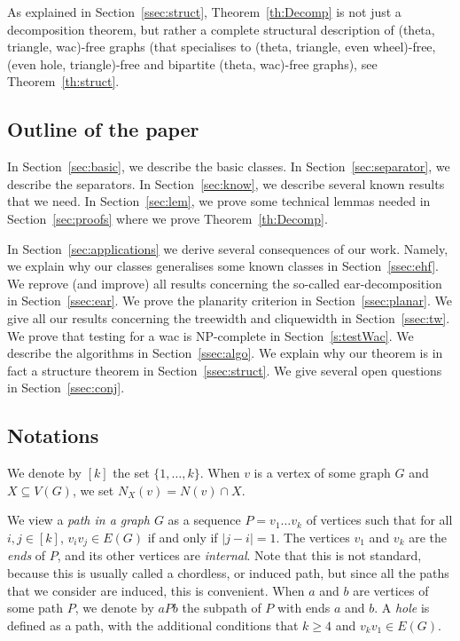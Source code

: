 \documentclass[11pt]{article}
\begin{document}
As explained in Section~\ref{ssec:struct}, Theorem~\ref{th:Decomp} is not just a decomposition theorem, but rather a complete structural description of (theta, triangle, wac)-free graphs (that specialises to  (theta, triangle, even wheel)-free, (even hole, triangle)-free and bipartite (theta, wac)-free graphs), see Theorem~\ref{th:struct}.


\subsection*{Outline of the paper}

In Section~\ref{sec:basic}, we describe the basic classes. 
In Section~\ref{sec:separator}, we describe the separators. 
In Section~\ref{sec:know}, we describe several known results that we need.  
In Section~\ref{sec:lem}, we prove some technical lemmas needed in Section~\ref{sec:proofs} where we prove Theorem~\ref{th:Decomp}. 

In Section~\ref{sec:applications} we derive several consequences of our work. Namely, we explain why our classes generalises some known classes in Section~\ref{ssec:ehf}. We reprove (and improve) all results concerning the so-called ear-decomposition in Section~\ref{ssec:ear}.  We prove the planarity criterion in Section~\ref{ssec:planar}.  We give all our results concerning the treewidth and cliquewidth in Section~\ref{ssec:tw}. 
We prove that testing for a wac is NP-complete in Section~\ref{s:testWac}.  We describe the algorithms in Section~\ref{ssec:algo}. We explain why our theorem is in fact a structure theorem in Section~\ref{ssec:struct}.  We give several open questions in Section~\ref{ssec:conj}. 


\subsection*{Notations}

We denote by $[k]$ the set $\{1, \dots, k\}$. When $v$ is a vertex of some graph $G$ and $X\subseteq V(G)$, we set $N_X(v) = N(v) \cap X$. 

We view a \emph{path in a graph $G$} as a sequence $P= v_1 \dots v_k$ of vertices such that for all $i, j \in [k]$, $v_iv_j\in E(G)$ if and only if $|j-i|=1$. The vertices $v_1$ and $v_k$ are the \emph{ends} of $P$, and its other vertices are \emph{internal}.   Note that this is not standard, because this is usually called a chordless, or induced path, but since all the paths that we consider are induced, this is convenient.  When $a$ and $b$ are vertices of some path $P$, we denote by  $aPb$ the subpath of $P$ with ends $a$ and $b$.  A \emph{hole} is defined as a path, with the additional conditions that $k\geq 4$ and $v_kv_1\in E(G)$. 
\end{document}
